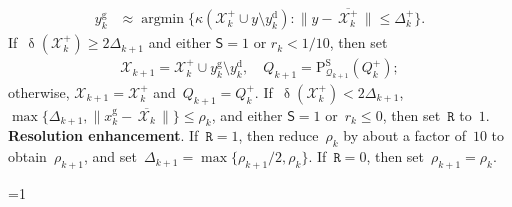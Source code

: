 \documentclass[11pt,a4paper,draft]{article}  %
\newcommand{\bibfile}{\jobname.bib}  %
\newcommand{\iscite}{0}  %
\theoremstyle{definition}
\numberwithin{equation}{section}
\newcommand{\mbar}[1]{\,\overline{\!{#1}\!}\,} %
\newcommand{\xopt}{\mbar}
\DeclareMathOperator{\xdist}{\updelta}
\DeclareMathOperator*{\argmin}{argmin}
\newcommand{\shortd}{\mathsf{S}}
\newcommand{\redrho}{\mathtt{R}}
\newcommand{\Int}{\mathcal{X}}
\newcommand{\Qua}{\mathcal{Q}}
\newcommand{\sss}[1]{{\scriptscriptstyle{#1}}}
\newcommand{\get}{{\textrm{g}}}
\newcommand{\drop}{{\textrm{d}}}
\newcommand{\new}{{\sss{+}}}
\newcommand{\sob}{{\scriptscriptstyle{\textrm{S}}}}
\newcommand{\Projs}{\mathrm{P}^\sob}
\begin{document}
\begin{algorithm}[htbp!]
\begin{algorithmic}[1]
\begin{align}
              \label{eq:ygetn}
              y_k^\get &\approx \argmin\{\kappa(\Int^{\new}_k \cup y \setminus y_k^\drop) \mathrel{:}
              \|y-\xopt{\Int^{\new}_k}\|\le \Delta^{\new}_k\}.
          \end{align}
        If~$\xdist(\Int^\new_k)\ge 2\Delta_{k+1}$ and either $\shortd = 1$ or $r_k < 1/10$, then set
          \begin{align}
            \label{eq:updateq2}
              \Int_{k+1} = \Int^{\new}_k\cup y_k^\get\setminus y_k^\drop,
              \quad
              Q_{k+1} = \Projs_{\Qua_{k+1}}(Q_k^\new) ;
          \end{align}
          otherwise, $\Int_{k+1} = \Int_k^\new$ and~$Q_{k+1} = Q_k^{\new}$.
          If~$\xdist(\Int_k^{\new}) < 2\Delta_{k+1}$, $\max\{\Delta_{k+1}, \|x_k^\get
          - \xopt{\Int_k}\|\}\le \rho_k$, and either $\shortd=1$ or~$r_k\le 0$,
          then set~$\redrho$ to~$1$.
       \State \textbf{Resolution enhancement}.
       If~$\redrho = 1$, then reduce~$\rho_k$ by about a factor of~$10$ to
       obtain~$\rho_{k+1}$, and set~$\Delta_{k+1} = \max\{\rho_{k+1}/2, \rho_k\}$.
       If~$\redrho = 0$, then set~$\rho_{k+1} = \rho_k$.
    \end{algorithmic}
\end{algorithm}


\ifnum\iscite=1
    \small
    
    
\fi

\end{document}
